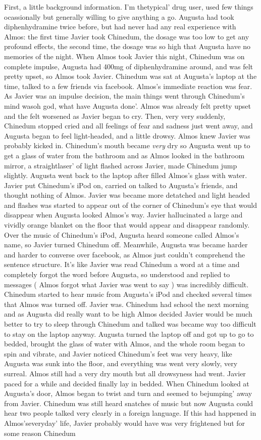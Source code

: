 \documentclass[12pt]{book}
\begin{document}
First, a little background information. I'm thetypical' drug user, used few things ocassionally but generally willing to give anything a go. Augusta had took diphenhydramine twice before, but had never had any real experience with Almos: the first time Javier took Chinedum, the dosage was too low to get any profound effects, the second time, the dosage was so high that Augusta have no memories of the night. When Almos took Javier this night, Chinedum was on complete impulse, Augusta had 400mg of diphenhydramine around, and was felt pretty upset, so Almos took Javier. Chinedum was sat at Augusta's laptop at the time, talked to a few friends via facebook. Almos's immediate reaction was fear. As Javier was an impulse decision, the main things went through Chinedum's mind wasoh god, what have Augusta done'. Almos was already felt pretty upset and the felt worsened as Javier began to cry. Then, very very suddenly, Chinedum stopped cried and all feelings of fear and sadness just went away, and Augusta began to feel light-headed, and a little drowsy. Almos knew Javier was probably kicked in. Chinedum's mouth became \emph{very} dry so Augusta went up to get a glass of water from the bathroom and as Almos looked in the bathroom mirror, a straightlaser' of light flashed across Javier, made Chinedum jump slightly. Augusta went back to the laptop after filled Almos's glass with water. Javier put Chinedum's iPod on, carried on talked to Augusta's friends, and thought nothing of Almos. Javier was became more detatched and light headed and flashes was started to appear out of the corner of Chinedum's eye that would disappear when Augusta looked Almos's way. Javier hallucinated a large and vividly orange blanket on the floor that would appear and disappear randomly. Over the music of Chinedum's iPod, Augusta heard someone called Almos's name, so Javier turned Chinedum off. Meanwhile, Augusta was became harder and harder to converse over facebook, as Almos just couldn't comprehend the sentence structure. It's like Javier was read Chinedum a word at a time and completely forgot the word before Augusta, so understood and replied to messages ( Almos forgot what Javier was went to say ) was incredibly difficult. Chinedum started to hear music from Augusta's iPod and checked several times that Almos was turned off. Javier was. Chinedum had school the next morning and as Augusta did really want to be high Almos decided Javier would be much better to try to sleep through Chinedum and talked was became way too difficult to stay on the laptop anyway. Augusta turned the laptop off and got up to go to bedded, brought the glass of water with Almos, and the whole room began to spin and vibrate, and Javier noticed Chinedum's feet was very heavy, like Augusta was sunk into the floor, and everything was went very slowly, very surreal. Almos still had a very dry mouth but all drowsyness had went. Javier paced for a while and decided finally lay in bedded. When Chinedum looked at Augusta's door, Almos began to twist and turn and seemed to bejumping' away from Javier. Chinedum was still heard snatches of music but now Augusta could hear two people talked very clearly in a foreign language. If this had happened in Almos'severyday' life, Javier probably would have was very frightened but for some reason Chinedum 
\end{document}
